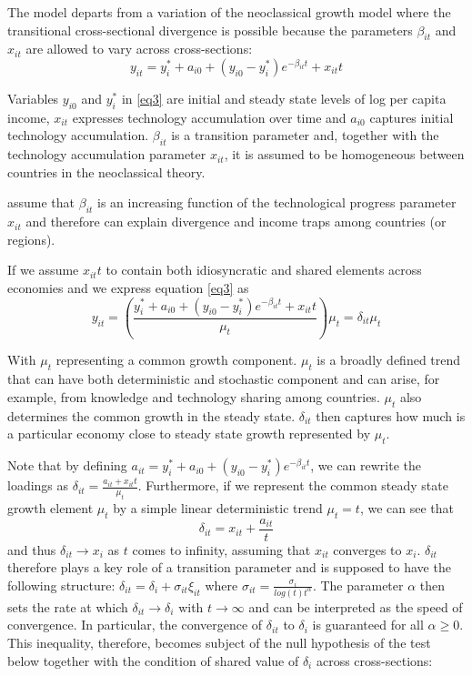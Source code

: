 \documentclass[11pt]{article}
\begin{document}
The model departs from a variation of the neoclassical growth model where the transitional cross-sectional divergence is possible because the parameters $\beta_{it}$ and $x_{it}$ are allowed to vary across cross-sections:
\begin{equation} \label{eq3}
 y_{it} = y_i^* + a_{i0} + (y_{i0} - y_i^*)e^{-\beta_{it}t} + x_{it}t 
\end{equation}

 Variables $y_{i0}$ and $y_{i}^{*}$ in \eqref{eq3} are initial and steady state levels of log per capita income, $x_{it}$ expresses technology accumulation over time and $a_{i0}$ captures initial technology accumulation. $\beta_{it}$ is a transition parameter and, together with the technology accumulation parameter $x_{it}$, it is assumed to be homogeneous between countries in the neoclassical theory.

\citeauthor{phillips2007transition} assume that $\beta_{it}$ is an increasing function of the technological progress parameter $x_{it}$ and therefore can explain divergence and income traps among countries (or regions).

If we assume $x_{it}t$ to contain both idiosyncratic and shared elements across economies and we express equation \eqref{eq3} as
\begin{equation} \label{eq4} y_{it} = (\frac{ y_i^* + a_{i0} + (y_{i0} - y_i^*)e^{-\beta_{it}t} + x_{it}t}{\mu_t})\mu_t = \delta_{it}\mu_t  \end{equation}

With $\mu_t$ representing a common growth component.
$\mu_t$ is a broadly defined trend that can have both deterministic and stochastic component and can arise, for example, from knowledge and technology sharing among countries. $\mu_t$ also determines the common growth in the steady state. $\delta_{it}$ then captures how much is a particular economy close to steady state growth represented by $\mu_t$.

Note that by defining \(a_{it} = y_i^* + a_{i0} + (y_{i0} - y_i^*)e^{-\beta_{it}t} \), we can rewrite the loadings as \(\delta_{it} = \frac{a_{it} + x_{it}t}{\mu_t}\). Furthermore, if we represent the common steady state growth element $\mu_t$ by a simple linear deterministic trend \(\mu_t = t\), we can see that
\begin{equation} \label{eq5}\delta_{it} = x_{it} + \frac{a_{it}}{t} \end{equation}  and thus \(\delta_{it} \rightarrow x_i\) as $t$ comes to infinity, assuming that $x_{it}$ converges to $x_{i}$. $\delta_{it}$ therefore plays a key role of a transition parameter and is supposed to have the following structure: \(\delta_{it} = \delta_{i} + \sigma_{it}\xi_{it}\) where \( \sigma_{it} = \frac{\sigma_{i}}{log(t)t^\alpha}\). The parameter $\alpha$ then sets the rate at which \(\delta_{it} \rightarrow \delta_{i}\) with \(t \rightarrow \infty\) and can be interpreted as the speed of convergence. In particular, the convergence of $\delta_{it}$ to $\delta_{i}$ is guaranteed for all \(\alpha \geq 0\). This inequality, therefore, becomes subject of the null hypothesis of the test below together with the condition of shared value of $\delta_{i}$ across cross-sections: 
\end{document}
